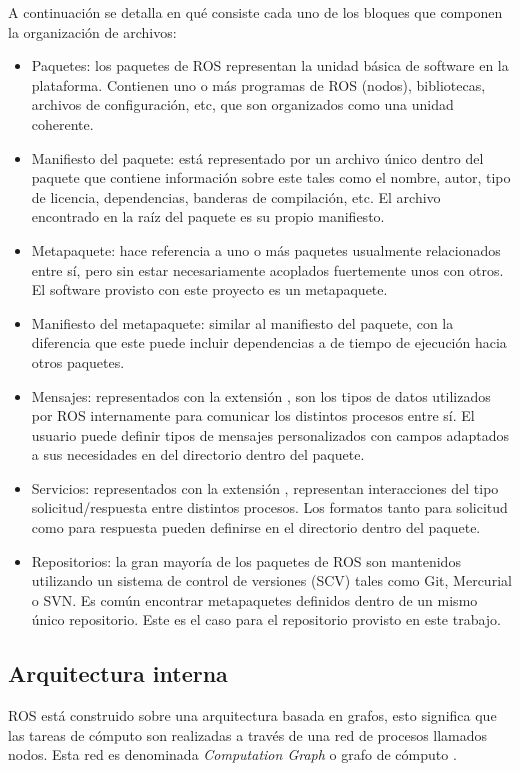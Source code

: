 \newpage
A continuación se detalla en qué consiste cada uno de los bloques que componen la organización de archivos:
\begin{itemize}
    \item Paquetes: los paquetes de ROS representan la unidad básica de software en la plataforma. Contienen uno o más programas de ROS (nodos), bibliotecas, archivos de configuración, etc, que son organizados como una unidad coherente.
    \item Manifiesto del paquete: está representado por un archivo único dentro del paquete que contiene información sobre este tales como el nombre, autor, tipo de licencia, dependencias, banderas de compilación, etc. El archivo  encontrado en la raíz del paquete es su propio manifiesto.
    \item Metapaquete: hace referencia a uno o más paquetes usualmente relacionados entre sí, pero sin estar necesariamente acoplados fuertemente unos con otros. El software provisto con este proyecto es un metapaquete.
    \item Manifiesto del metapaquete: similar al manifiesto del paquete, con la diferencia que este puede incluir dependencias a de tiempo de ejecución hacia otros paquetes.
    \item Mensajes: representados con la extensión , son los tipos de datos utilizados por ROS internamente para comunicar los distintos procesos entre sí. El usuario puede definir tipos de mensajes personalizados con campos adaptados a sus necesidades en del directorio  dentro del paquete.
    \item Servicios: representados con la extensión , representan interacciones del tipo solicitud/respuesta entre distintos procesos. Los formatos tanto para solicitud como para respuesta pueden definirse en el directorio  dentro del paquete.
    \item Repositorios: la gran mayoría de los paquetes de ROS son mantenidos utilizando un sistema de control de versiones (SCV) tales como Git, Mercurial o SVN. Es común encontrar metapaquetes definidos dentro de un mismo único repositorio. Este es el caso para el repositorio provisto en este trabajo.
\end{itemize}

\subsection{Arquitectura interna}
ROS está construido sobre una arquitectura basada en grafos, esto significa que las tareas de cómputo son realizadas a través de una red de procesos llamados nodos. Esta red es denominada \textit{Computation Graph} o grafo de cómputo \citep{BOOK:1}.

